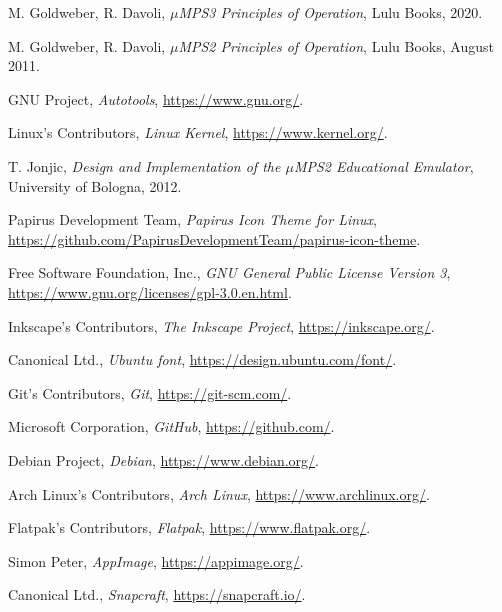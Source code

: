 \documentclass[12pt,a4paper,openright,twoside]{report}
\begin{document}
\begin{thebibliography}{99}
	M. Goldweber, R. Davoli,
	\textit{$\mu$MPS3 Principles of Operation},
	Lulu Books, 2020.

	M. Goldweber, R. Davoli,
	\textit{$\mu$MPS2 Principles of Operation},
	Lulu Books, August 2011.

	GNU Project,
	\textit{Autotools},
	\url{https://www.gnu.org/}.

	Linux's Contributors,
	\textit{Linux Kernel},
	\url{https://www.kernel.org/}.

	T. Jonjic,
	\textit{Design and Implementation of the $\mu$MPS2 Educational Emulator},
	University of Bologna, 2012.

	Papirus Development Team,
	\textit{Papirus Icon Theme for Linux},
	\url{https://github.com/PapirusDevelopmentTeam/papirus-icon-theme}.

	Free Software Foundation, Inc.,
	\textit{GNU General Public License Version 3},
	\url{https://www.gnu.org/licenses/gpl-3.0.en.html}.

	Inkscape's Contributors,
	\textit{The Inkscape Project},
	\url{https://inkscape.org/}.

	Canonical Ltd.,
	\textit{Ubuntu font},
	\url{https://design.ubuntu.com/font/}.

	Git's Contributors,
	\textit{Git},
	\url{https://git-scm.com/}.

	Microsoft Corporation,
	\textit{GitHub},
	\url{https://github.com/}.

	Debian Project,
	\textit{Debian},
	\url{https://www.debian.org/}.

	Arch Linux's Contributors,
	\textit{Arch Linux},
	\url{https://www.archlinux.org/}.

	Flatpak's Contributors,
	\textit{Flatpak},
	\url{https://www.flatpak.org/}.

	Simon Peter,
	\textit{AppImage},
	\url{https://appimage.org/}.

	Canonical Ltd.,
	\textit{Snapcraft},
	\url{https://snapcraft.io/}.

\end{thebibliography}
\end{document}
